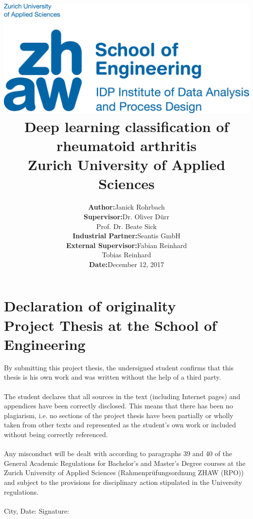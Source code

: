 \documentclass[12pt]{article}
\begin{document}
\title{
\vspace{-2.0cm}
\includegraphics{zhaw}\\ 
\vspace{3cm}
Deep learning classification of rheumatoid arthritis\\
{\Large Zurich University of Applied Sciences}}
\author{\begin{tabular}{rl}
  \textbf{Author:} & Janick Rohrbach \\
  \textbf{Supervisor:} & Dr. Oliver Dürr \\ & Prof. Dr. Beate Sick \\
  \textbf{Industrial Partner:} & Seantis GmbH \\
  \textbf{External Supervisor:} & Fabian Reinhard \\ & Tobias Reinhard \\
  \textbf{Date:} & December 12, 2017
\end{tabular}}
\date{}
\maketitle

\newpage

\section*{Declaration of originality\\ \large{Project Thesis at the School of Engineering}}
By submitting this project thesis, the undersigned student confirms that this thesis is his own work and was written without the help of a third party. \\
\\
The student declares that all sources in the text (including Internet pages) and appendices have been correctly disclosed. This means that there has been no plagiarism, i.e. no sections of the project thesis have been partially or wholly taken from other texts and represented as the student’s own work or included without being correctly referenced. \\
\\
Any misconduct will be dealt with according to paragraphs 39 and 40 of the General Academic Regulations for Bachelor’s and Master’s Degree courses at the Zurich University of Applied Sciences (Rahmenprüfungsordnung ZHAW (RPO)) and subject to the provisions for disciplinary action stipulated in the University regulations.\\
\vspace{3cm} \\
City, Date: \hspace{5cm} Signature:
\end{document}
